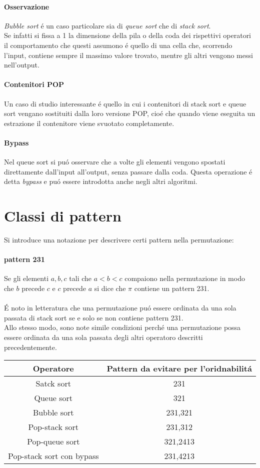 \paragraph*{Osservazione}\textit{Bubble sort} \'e un caso particolare sia di \textit{queue sort} che di \textit{stack sort}.\\
Se infatti si fissa a 1 la dimensione della pila o della coda dei rispettivi operatori il comportamento che questi assumono \'e quello di una cella che, scorrendo l'input, contiene sempre il massimo valore trovato, mentre gli altri vengono messi nell'output.
\paragraph*{Contenitori POP}Un caso di studio interessante \'e quello in cui i contenitori di stack sort e queue sort vengano sostituiti dalla loro versione POP, cio\'e che quando viene eseguita un estrazione il contenitore viene svuotato completamente. 
\paragraph*{Bypass}Nel queue sort si pu\'o osservare che a volte gli elementi vengono spostati direttamente dall'input all'output, senza passare dalla coda. Questa operazione \'e detta \textit{bypass} e pu\'o essere introdotta anche negli altri algoritmi.
\section*{Classi di pattern}
Si introduce una notazione per descrivere certi pattern nella permutazione:
\paragraph*{pattern 231}Se gli elementi ${a,b,c}$ tali che $a<b<c$ compaiono nella permutazione in modo che $b$ precede $c$ e $c$ precede $a$ si dice che $\pi$ contiene un pattern 231.\\\\
\'E noto in letteratura che una permutazione pu\'o essere ordinata da una sola passata di stack sort se e solo se non contiene pattern 231.\\
Allo stesso modo, sono note simile condizioni perch\'e una permutazione possa essere ordinata da una sola passata degli altri operatoro descritti precedentemente.
\begin{center}
\begin{tabular}{ |c|c| } 
\hline
\textbf{Operatore} & \textbf{Pattern da evitare per l'oridnabilit\'a} \\ 
\hline
Satck sort & 231\\ 
Queue sort & 321 \\ 
Bubble sort & 231,321 \\ 
Pop-stack sort & 231,312\\ 
Pop-queue sort& 321,2413\\ 
Pop-stack sort con bypass &231,4213 \\ 
\hline
\end{tabular}
\end{center}
